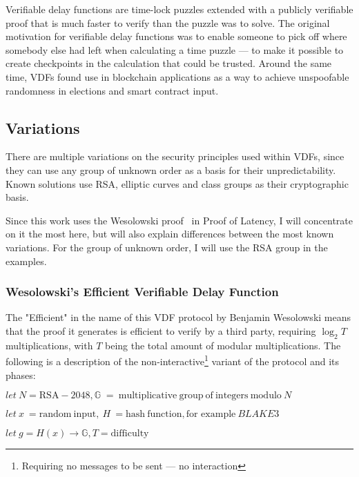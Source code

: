 Verifiable delay functions are time-lock puzzles extended with a publicly verifiable proof that is much faster to verify than the puzzle was to solve. The original motivation for verifiable delay functions was to enable someone to pick off where somebody else had left when calculating a time puzzle --- to make it possible to create checkpoints in the calculation that could be trusted. Around the same time, VDFs found use in blockchain applications as a way to achieve unspoofable randomness in elections and smart contract input.

\subsection{Variations}
There are multiple variations on the security principles used within VDFs, since they can use any group of unknown order as a basis for their unpredictability. Known solutions use RSA, elliptic curves and class groups as their cryptographic basis.

Since this work uses the Wesolowski proof~\cite{Wesolowski2018-rf} in Proof of Latency, I will concentrate on it the most here, but will also explain differences between the most known variations. For the group of unknown order, I will use the RSA group in the examples.

\subsubsection{Wesolowski's Efficient Verifiable Delay Function}
The "Efficient" in the name of this VDF protocol by Benjamin Wesolowski means that the proof it generates is efficient to verify by a third party, requiring \( \log _{2} T \) multiplications, with \( T \) being the total amount of modular multiplications. The following is a description of the non-interactive\footnote{Requiring no messages to be sent --- no interaction} variant of the protocol and its phases:

\( let \: N = \mathrm{RSA-2048}, \mathbb{G} \; = \: \mathrm{multiplicative} \: \mathrm{group} \: \mathrm{of} \: \mathrm{integers} \: \mathrm{modulo} \: N \)

\( let \: x \: = \mathrm{random} \: \mathrm{input},  \: H \: = \mathrm{hash} \: \mathrm{function}, \text{for example} \: BLAKE3 \)

\( let \: g = H(x) \to \mathbb{G}, T = \mathrm{difficulty} \)

